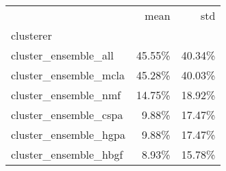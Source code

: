 \begin{tabular}{lrr}
\toprule
{} &   mean &    std \\
clusterer             &        &        \\
\midrule
cluster\_ensemble\_all  & 45.55\% & 40.34\% \\
cluster\_ensemble\_mcla & 45.28\% & 40.03\% \\
cluster\_ensemble\_nmf  & 14.75\% & 18.92\% \\
cluster\_ensemble\_cspa &  9.88\% & 17.47\% \\
cluster\_ensemble\_hgpa &  9.88\% & 17.47\% \\
cluster\_ensemble\_hbgf &  8.93\% & 15.78\% \\
\bottomrule
\end{tabular}

